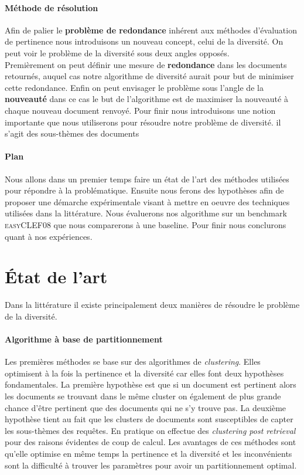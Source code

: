 \documentclass{article}
\begin{document}
\paragraph{Méthode de résolution}
Afin de palier le \textbf{problème de redondance} inhérent aux méthodes d'évaluation de pertinence nous introduisons un nouveau concept, celui de la diversité. On peut voir le problème de la diversité sous deux angles opposés. \\
Premièrement on peut définir une mesure de \textbf{redondance} dans les documents retournés, auquel cas notre algorithme de diversité aurait pour but de minimiser cette redondance. Enfin on peut envisager le problème sous l'angle de la \textbf{nouveauté} dans ce cas le but de l'algorithme est de maximiser la nouveauté à chaque nouveau document renvoyé. Pour finir nous introduisons une notion importante que nous utiliserons pour résoudre notre problème de diversité. il s'agit des sous-thèmes des documents

\paragraph{Plan}
Nous allons dans un premier temps faire un état de l'art des méthodes utilisées pour répondre à la problématique. Ensuite nous ferons des hypothèses afin de proposer une démarche expérimentale visant à mettre en oeuvre des techniques utilisées dans la littérature. Nous évaluerons nos algorithme sur un benchmark \textsc{easyCLEF08} que nous comparerons à une baseline. Pour finir nous conclurons quant à nos expériences.

\section{État de l'art}
Dans la littérature il existe principalement deux manières de résoudre le problème de la diversité.\\

\paragraph{Algorithme à base de partitionnement}
Les premières méthodes se base sur des algorithmes de \textit{clustering}. Elles optimisent à la fois la pertinence et la diversité car elles font deux hypothèses fondamentales. La première hypothèse est que si un document est pertinent alors les documents se trouvant dans le même cluster on également de plus grande chance d'être pertinent que des documents qui ne s'y trouve pas. La deuxième hypothèse tient au fait que les clusters de documents sont susceptibles de capter les sous-thèmes des requêtes. En pratique on effectue des \textit{clustering post retrieval} pour des raisons évidentes de coup de calcul. Les avantages de ces méthodes sont qu'elle optimise en même temps la pertinence et la diversité et les inconvénients sont la difficulté à trouver les paramètres pour avoir un partitionnement optimal.
\end{document}
